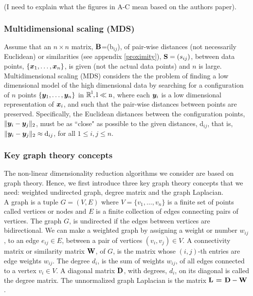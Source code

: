 (I need to explain what the figures in A-C mean based on the authors paper).


\subsubsection{Multidimensional scaling (MDS)}
Assume that an $n\times n$ matrix, $\textbf{B}$=(b$_{ij}$), of pair-wise distances
(not necessarily Euclidean) or similarities (see appendix \ref{proximity}), $\textbf{S} = (s_{ij})$, between data points, $\{\boldsymbol{x}_{1}, \ldots, \boldsymbol{x}_{n} \}$, is given (not the actual data points) and $n$ is large.
Multidimensional scaling (MDS) \cite{CoxT2000, MardiaK.V1979Ma} considers the the problem of finding a low dimensional model of the high dimensional data by searching for a configuration of $n$ points $\{\boldsymbol{y}_{1}, \ldots, \boldsymbol{y}_{n} \}$ in $\operatorname{\mathbb{R}}^{\text{l}}, \text{l} \ll \text{n}$, where each $\boldsymbol{y}_{i}$ is a low dimensional representation of $\boldsymbol{x}_{i}$, and such that the pair-wise distances between points are preserved. Specifically, the Euclidean distances between the configuration points, $\lVert\boldsymbol{y}_{i} - \boldsymbol{y}_{j}\rVert_{2}$, must be as ``close" as possible to  the given distances, d$_{ij}$, that is, $\lVert\boldsymbol{y}_{i} - \boldsymbol{y}_{j}\rVert_{2} \approx \text{d}_{ij}$, for all $1 \leq i, j \leq n$.


\subsubsection{Key graph theory concepts}
The non-linear dimensionality reduction algorithms we consider are based on graph theory. Hence, we first introduce three key graph theory concepts that we need: weighted undirected graph, degree matrix and the graph Laplacian.\\
A graph is a tuple $G = (V,E)$ where $V = \{v_1, \ldots , v_n\}$ is a finite set of points called vertices or nodes and $E$ is a finite collection of edges connecting pairs of vertices. The graph $G$, is undirected if the edges between vertices are bidirectional.
We can make a weighted graph by assigning a weight or number $w_{ij}$, to an edge $e_{ij} \in E$, between a pair of vertices $(v_i, v_j) \in V$. A connectivity matrix or similarity matrix $\textbf{W}$, of $G$, is the matrix whose $(i,j)$-th entries are edge weights $w_{ij}$.
The degree $d_i$, is the sum of weights $w_{ij}$, of all edges connected to a vertex $v_i \in V$.
A diagonal matrix $\textbf{D}$, with degrees, $d_{i}$, on its diagonal is called the degree matrix.
The unnormalized graph Laplacian is the  matrix $\textbf{L = D} - \textbf{W}$.

